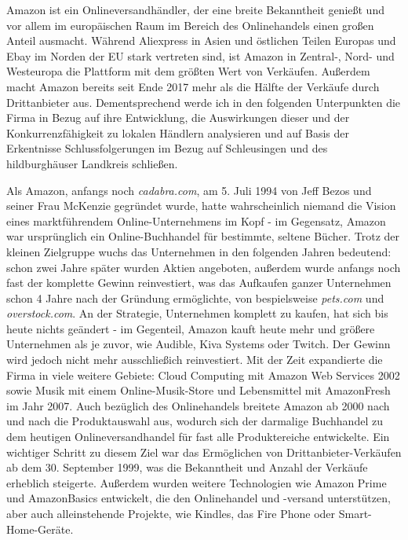 Amazon ist ein Onlineversandhändler, der eine breite Bekanntheit genießt und vor allem im europäischen Raum im Bereich des Onlinehandels einen großen Anteil ausmacht. Während Aliexpress in Asien und östlichen Teilen Europas und Ebay im Norden der EU stark vertreten sind, ist Amazon in Zentral-, Nord- und Westeuropa die Plattform mit dem größten Wert von Verkäufen\cite[S. 22]{EuroCommerce}. Außerdem macht Amazon bereits seit Ende 2017 mehr als die Hälfte der Verkäufe durch Drittanbieter aus\cite[S. 25]{Haendlerbund}. Dementsprechend werde ich in den folgenden Unterpunkten die Firma in Bezug auf ihre Entwicklung, die Auswirkungen dieser und der Konkurrenzfähigkeit zu lokalen Händlern analysieren und auf Basis der Erkentnisse Schlussfolgerungen im Bezug auf Schleusingen und des hildburghäuser Landkreis schließen.

Als Amazon, anfangs noch \emph{cadabra.com}, am 5. Juli 1994 von Jeff Bezos und seiner Frau McKenzie gegründet wurde, hatte wahrscheinlich niemand die Vision eines marktführendem Online-Unternehmens im Kopf - im Gegensatz, Amazon war ursprünglich ein Online-Buchhandel für bestimmte, seltene Bücher\cite[S. 17]{Graf}. Trotz der kleinen Zielgruppe wuchs das Unternehmen in den folgenden Jahren bedeutend: schon zwei Jahre später wurden Aktien angeboten, außerdem wurde anfangs noch fast der komplette Gewinn reinvestiert\cite{Rosoff}, was das Aufkaufen ganzer Unternehmen schon 4 Jahre nach der Gründung ermöglichte, von bespielsweise \emph{pets.com} und \emph{overstock.com}\cite{ChannelAdvisor}. An der Strategie, Unternehmen komplett zu kaufen, hat sich bis heute nichts geändert - im Gegenteil, Amazon kauft heute mehr und größere Unternehmen als je zuvor\cite[S. 27]{Haendlerbund}, wie Audible, Kiva Systems oder Twitch\cite{Sherman}. Der Gewinn wird jedoch nicht mehr ausschließich reinvestiert\cite{Rosoff}. Mit der Zeit expandierte die Firma in viele weitere Gebiete: Cloud Computing mit Amazon Web Services 2002 sowie Musik mit einem Online-Musik-Store und Lebensmittel mit AmazonFresh im Jahr 2007\cite{Sherman, ChannelAdvisor}. Auch bezüglich des Onlinehandels breitete Amazon ab 2000 nach und nach die Produktauswahl aus, wodurch sich der darmalige Buchhandel zu dem heutigen Onlineversandhandel für fast alle Produktereiche entwickelte. Ein wichtiger Schritt zu diesem Ziel war das Ermöglichen von Drittanbieter-Verkäufen ab dem 30. September 1999, was die Bekanntheit und Anzahl der Verkäufe erheblich steigerte\cite{Sherman}. Außerdem wurden weitere Technologien wie Amazon Prime und AmazonBasics entwickelt, die den Onlinehandel und -versand unterstützen\cite{ChannelAdvisor}, aber auch alleinstehende Projekte, wie Kindles, das Fire Phone oder Smart-Home-Geräte\cite{Sherman}.

